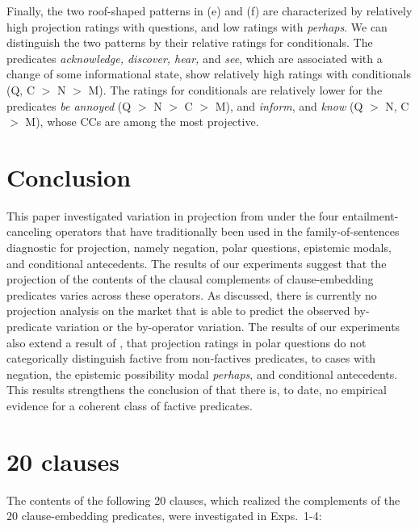\documentclass[a4paper,12pt,twoside]{article}
\begin{document}
	Finally, the two roof-shaped patterns in (e) and (f) are characterized by relatively high projection ratings with questions, and low ratings with {\em perhaps}. We can distinguish the two patterns by their relative ratings for conditionals. The predicates \emph{acknowledge, discover, hear,} and \emph{see}, which are associated with a change of some informational state, show relatively high ratings with conditionals (Q, C $>$ N $>$ M). The ratings for conditionals are relatively lower for the predicates \emph{be annoyed} (Q $>$ N $>$ C $>$ M), and \emph{inform}, and \emph{know} (Q $>$ N, C $>$ M), whose CCs are among the most projective.

\section{Conclusion}

This paper investigated variation in projection from under the four entailment-canceling operators that have traditionally been used in the family-of-sentences diagnostic for projection, namely negation, polar questions, epistemic modals, and conditional antecedents. The results of our experiments suggest that the projection of the contents of the clausal complements of clause-embedding predicates varies across these operators. As discussed, there is currently no projection analysis on the market that is able to predict the observed by-predicate variation or the by-operator variation. The results of our experiments also extend a result of \citealt{degen_are_2022}, that projection ratings in polar questions do not categorically distinguish factive from non-factives predicates, to cases with negation, the epistemic possibility modal \textit{perhaps}, and conditional antecedents. This results strengthens the conclusion of \citealt{degen_are_2022} that there is, to date, no empirical evidence for a coherent class of factive predicates.






\newpage
\appendix

\section{20 clauses}\label{app:a-clauses}
    The contents of the following 20 clauses, which realized the complements of the 20 clause-embedding predicates, were investigated in Exps.~1-4:
\end{document}

